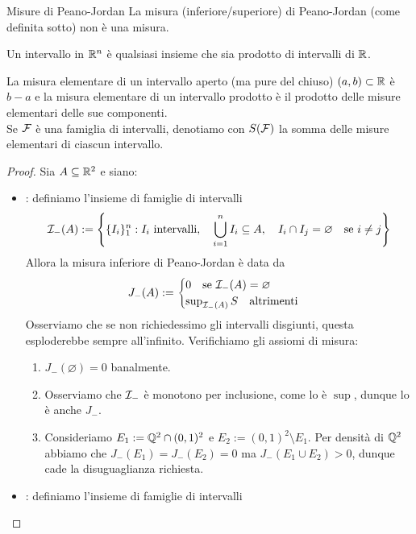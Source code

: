 \begin{remark}{Misure di Peano-Jordan}{}
    La misura (inferiore/superiore) di Peano-Jordan (come definita sotto) non è una misura.
    \begin{notation}
        Un intervallo in $\mathbb{R}^n$ è qualsiasi insieme che sia prodotto di intervalli di $\mathbb{R}$.
    \end{notation}
    \begin{notation}
        La misura elementare di un intervallo aperto (ma pure del chiuso) $(a,b)\subset \mathbb{R}$ è $b-a$ e la misura elementare di un intervallo prodotto è il prodotto delle misure elementari delle sue componenti.\\
        Se $\mathcal{F}$ è una famiglia di intervalli, denotiamo con $S(\mathcal{F})$ la somma delle misure elementari di ciascun intervallo.
    \end{notation}
    \begin{proof}
        Sia $A \subseteq\mathbb{R}^2$ e siano:\begin{itemize}
            \item {}: definiamo l'insieme di famiglie di intervalli
            \[\mathcal{I}_-(A) := \left\{ \{I_i\}_1^n : I_i \text{ intervalli},\quad \bigcup_{i=1}^n I_i \subseteq A, \quad I_i \cap I_j = \varnothing \quad \text{se }i \neq j \right\}\]
            Allora la misura inferiore di Peano-Jordan è data da
            \[J_-(A) := \begin{cases}
                0 \quad\text{se } \mathcal{I}_-(A) = \varnothing\\
                \sup_{\mathcal{I}_-(A)} S \quad\text{altrimenti}
            \end{cases}\]
            Osserviamo che se non richiedessimo gli intervalli disgiunti, questa esploderebbe sempre all'infinito. Verifichiamo gli assiomi di misura:\begin{enumerate}
                \item $J_-(\varnothing) = 0$ banalmente.
                \item Osserviamo che $\mathcal{I}_-$ è monotono per inclusione, come lo è $\sup$, dunque lo è anche $J_-$.
                \item Consideriamo $E_1 := \mathbb{Q}^2\cap (0,1)^2$ e $E_2 := (0,1)^2 \setminus E_1$. Per densità di $\mathbb{Q}^2$ abbiamo che $J_-(E_1) = J_-(E_2) = 0$ ma $J_-(E_1 \cup E_2)>0$, dunque cade la disuguaglianza richiesta.  
            \end{enumerate}
            \item {}: definiamo l'insieme di famiglie di intervalli

\end{itemize}
\end{proof}
\end{remark}
